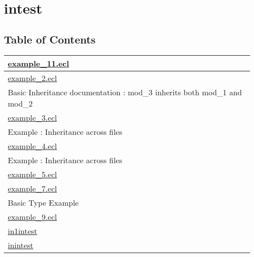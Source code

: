 \chapter*{intest}
\hypertarget{ecldoc:toc:intest}{}


\section*{Table of Contents}
{\renewcommand{\arraystretch}{1.5}
\begin{longtable}{|p{\textwidth}|}
\hline
\hyperlink{ecldoc:toc:intest.example_11}{example\_11.ecl} \\
\hline
\hyperlink{ecldoc:toc:intest.example_2}{example\_2.ecl} \\
Basic Inheritance documentation : mod\_3 inherits both mod\_1 and mod\_2 \\
\hline
\hyperlink{ecldoc:toc:intest.example_3}{example\_3.ecl} \\
Example : Inheritance across files \\
\hline
\hyperlink{ecldoc:toc:intest.example_4}{example\_4.ecl} \\
Example : Inheritance across files \\
\hline
\hyperlink{ecldoc:toc:intest.example_5}{example\_5.ecl} \\
\hline
\hyperlink{ecldoc:toc:intest.example_7}{example\_7.ecl} \\
Basic Type Example \\
\hline
\hyperlink{ecldoc:toc:intest.example_9}{example\_9.ecl} \\
\hline
\hyperlink{ecldoc:toc:intest/in1intest}{in1intest} \\
\hline
\hyperlink{ecldoc:toc:intest/inintest}{inintest} \\
\hline
\end{longtable}
}










